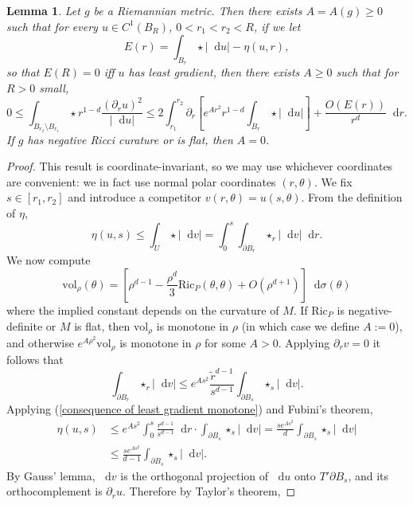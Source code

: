 \documentclass[reqno,10pt]{amsart}
\newcommand{\Ric}{\mathrm{Ric}}
\newcommand*\dif{\mathop{}\!\mathrm{d}}
\newcommand{\vol}{\mathrm{vol}}
\newtheorem{lemma}[theorem]{Lemma}
\theoremstyle{definition}
\numberwithin{equation}{section}
\begin{document}
\begin{lemma}\label{monotonicity lemma}
Let $g$ be a Riemannian metric. Then there exists $A = A(g) \geq 0$ such that for every $u \in C^1(B_R)$, $0 < r_1 < r_2 < R$, if we let
$$E(r) = \int_{B_r} \star |\dif u| - \eta(u, r),$$
so that $E(R) = 0$ iff $u$ has least gradient, then there exists $A \geq 0$ such that for $R > 0$ small,
\begin{equation}\label{monotonicity lemma eqn}
0 \leq \int_{B_{r_2} \setminus B_{r_1}} \star r^{1 - d}\frac{(\partial_ru)^2}{|\dif u|} \leq 2\int_{r_1}^{r_2} \partial_r \left[e^{Ar^2} r^{1-d}\int_{B_r} \star |\dif u|\right] + \frac{O(E(r))}{r^d} \dif r.
\end{equation}
If $g$ has negative Ricci curature or is flat, then $A = 0$.
\end{lemma}
\begin{proof}
This result is coordinate-invariant, so we may use whichever coordinates are convenient: we in fact use normal polar coordinates $(r, \theta)$.
We fix $s \in [r_1, r_2]$ and introduce a competitor $v(r, \theta) = u(s, \theta)$.
From the definition of $\eta$,
\begin{equation}\label{consequence of least gradient monotone}
    \eta(u, s) \leq \int_U \star |\dif v| = \int_0^s \int_{\partial B_r} \star_r |\dif v| \dif r.
\end{equation}
We now compute
$$\vol_\rho(\theta) = \left[\rho^{d - 1} - \frac{\rho^d}{3} \Ric_P(\theta, \theta) + O(\rho^{d + 1})\right] \dif \sigma(\theta)$$
where the implied constant depends on the curvature of $M$.
If $\Ric_P$ is negative-definite or $M$ is flat, then $\vol_\rho$ is monotone in $\rho$ (in which case we define $A := 0$), and otherwise $e^{A\rho^2} \vol_\rho$ is monotone in $\rho$ for some $A > 0$.
Applying $\partial_r v = 0$ it follows that
\begin{equation}\label{introduce the ricci tensor}
\int_{\partial B_r} \star_r |\dif v| \leq e^{As^2} \frac{\tilde r^{d - 1}}{s^{d - 1}} \int_{\partial B_s} \star_s |\dif v|.
\end{equation}
Applying (\ref{consequence of least gradient monotone}) and Fubini's theorem,
\begin{align*}
\eta(u, s) &\leq e^{As^2} \int_0^s \frac{r^{d - 1}}{s^{d - 1}} \dif r \cdot \int_{\partial B_s} \star_s |\dif v| = \frac{s e^{As^2}}{d} \int_{\partial B_s} \star_s |\dif v|\\
&\leq \frac{s e^{As^2}}{d - 1} \int_{\partial B_s} \star_s |\dif v|.
\end{align*}
By Gauss' lemma, $\dif v$ is the orthogonal projection of $\dif u$ onto $T' \partial B_s$, and its orthocomplement is $\partial_r u$. Therefore by Taylor's theorem,

\end{proof}
\end{document}
